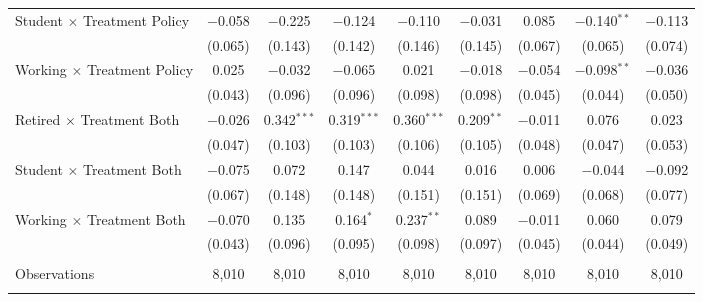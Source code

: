 \begin{tabular}{@{\extracolsep{5pt}}lcccccccc}
 Student $\times$ Treatment Policy & $-$0.058 & $-$0.225 & $-$0.124 & $-$0.110 & $-$0.031 & 0.085 & $-$0.140$^{**}$ & $-$0.113 \\ 
  & (0.065) & (0.143) & (0.142) & (0.146) & (0.145) & (0.067) & (0.065) & (0.074) \\ 
 Working $\times$ Treatment Policy & 0.025 & $-$0.032 & $-$0.065 & 0.021 & $-$0.018 & $-$0.054 & $-$0.098$^{**}$ & $-$0.036 \\ 
  & (0.043) & (0.096) & (0.096) & (0.098) & (0.098) & (0.045) & (0.044) & (0.050) \\ 
 Retired $\times$ Treatment Both & $-$0.026 & 0.342$^{***}$ & 0.319$^{***}$ & 0.360$^{***}$ & 0.209$^{**}$ & $-$0.011 & 0.076 & 0.023 \\ 
  & (0.047) & (0.103) & (0.103) & (0.106) & (0.105) & (0.048) & (0.047) & (0.053) \\ 
 Student $\times$ Treatment Both & $-$0.075 & 0.072 & 0.147 & 0.044 & 0.016 & 0.006 & $-$0.044 & $-$0.092 \\ 
  & (0.067) & (0.148) & (0.148) & (0.151) & (0.151) & (0.069) & (0.068) & (0.077) \\ 
 Working $\times$ Treatment Both & $-$0.070 & 0.135 & 0.164$^{*}$ & 0.237$^{**}$ & 0.089 & $-$0.011 & 0.060 & 0.079 \\ 
  & (0.043) & (0.096) & (0.095) & (0.098) & (0.097) & (0.045) & (0.044) & (0.049) \\ 
\hline \\[-1.8ex] 

Observations & 8,010 & 8,010 & 8,010 & 8,010 & 8,010 & 8,010 & 8,010 & 8,010 \\ 
\hline 
\hline \\[-1.8ex] 
\end{tabular} 